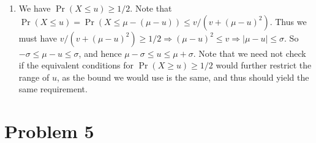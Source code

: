 \documentclass{article}
\begin{document}
\begin{enumerate}[label=(\roman*),topsep=0pt,itemsep=1ex,partopsep=1ex,parsep=1ex]
    \item We have $\Pr{}(X \leq u) \geq 1/2$. Note that $\Pr{}(X \leq u) = \Pr{}(X \leq \mu - (\mu - u)) \leq v/(v + (\mu - u)^2)$. Thus we must have $v/(v + (\mu-u)^2) \geq 1/2 \Longrightarrow (\mu - u)^2 \leq v \Longrightarrow |\mu - u| \leq \sigma$. So $-\sigma \leq \mu - u \leq \sigma$, and hence $\mu - \sigma \leq u \leq \mu + \sigma$. Note that we need not check if the equivalent conditions for $\Pr{}(X \geq u) \geq 1/2$ would further restrict the range of $u$, as the bound we would use is the same, and thus should yield the same requirement.

\end{enumerate}

\section*{Problem 5}
\end{document}
